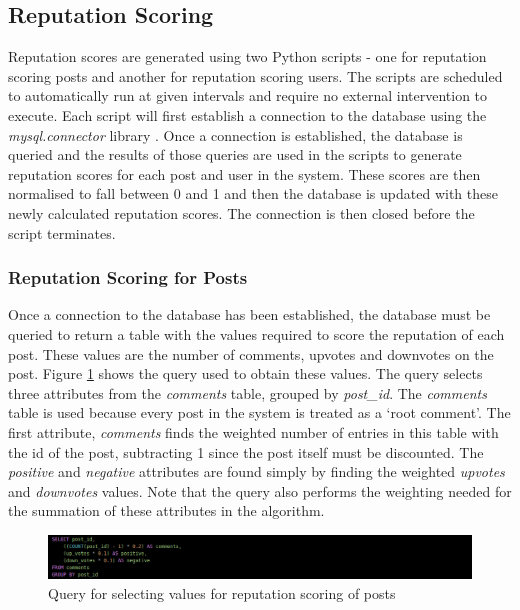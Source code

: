 \subsection{Reputation Scoring}
Reputation scores are generated using two Python scripts - one for reputation scoring posts and another for reputation scoring users. The scripts are scheduled to automatically run at given intervals and require no external intervention to execute. Each script will first establish a connection to the database using the \emph{mysql.connector} library \cite{MySQL:MySQLConnector}. Once a connection is established, the database is queried and the results of those queries are used in the scripts to generate reputation scores for each post and user in the system. These scores are then normalised to fall between 0 and 1 and then the database is updated with these newly calculated reputation scores. The connection is then closed before the script terminates.

\subsubsection{Reputation Scoring for Posts}
Once a connection to the database has been established, the database must be queried to return a table with the values required to score the reputation of each post. These values are the number of comments, upvotes and downvotes on the post. Figure \ref{fig:PostRepQuery} shows the query used to obtain these values. The query selects three attributes from the \emph{comments} table, grouped by \emph{post\_id}. The \emph{comments} table is used because every post in the system is treated as a `root comment'. The first attribute, \emph{comments} finds the weighted number of entries in this table with the id of the post, subtracting 1 since the post itself must be discounted. The \emph{positive} and \emph{negative} attributes are found simply by finding the weighted \emph{upvotes} and \emph{downvotes} values. Note that the query also performs the weighting needed for the summation of these attributes in the algorithm.

\begin{figure}[H]
\centering
\includegraphics[width=\textwidth]{Images/Implementation/PostRepQuery}
\caption{Query for selecting values for reputation scoring of posts}
\label{fig:PostRepQuery}
\end{figure}

